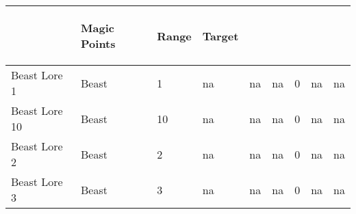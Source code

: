 \documentclass[twoside]{book}
\begin{document}
\begin{longtable}{p{1.25in}lp{2em}p{3em}llp{7em}ll}
  &
  \begin{turn}{70}{Magic Points}\end{turn}
          
  &
  \begin{turn}{70}{Range}\end{turn}
          
  &
  \begin{turn}{70}{Target}\end{turn}
          
  \\
  \hline
  \endhead
      
  \raggedright
           Beast Lore 1 
  &
   Beast 
  &
   1 
  &
  
           na 
  &
   na
           
  &
   na
           
  &
   0
           
  &
   na
           
  &
   na
           
  \tabularnewline
      
  \raggedright
           Beast Lore 10 
  &
   Beast 
  &
   10 
  &
  
           na 
  &
   na
           
  &
   na
           
  &
   0
           
  &
   na
           
  &
   na
           
  \tabularnewline
      
  \raggedright
           Beast Lore 2 
  &
   Beast 
  &
   2 
  &
  
           na 
  &
   na
           
  &
   na
           
  &
   0
           
  &
   na
           
  &
   na
           
  \tabularnewline
      
  \raggedright
           Beast Lore 3 
  &
   Beast 
  &
   3 
  &
  
           na 
  &
   na
           
  &
   na
           
  &
   0
           
  &
   na
           
  &
   na
           
  \tabularnewline
      

\end{longtable}
\end{document}
